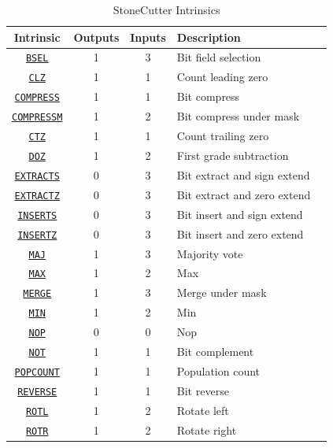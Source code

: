 \documentclass{article}
\begin{document}
\begin{table}[h]
\begin{center}
\caption{StoneCutter Intrinsics}
\vspace{0.125in}
\label{tab:scintrins}
\begin{tabular}{|c|c|c|l|l}
\hline
\textbf{Intrinsic} & \textbf{Outputs} & \textbf{Inputs} & \textbf{Description}\\
\hline
\hyperref[sec:BSEL]{\texttt{BSEL}} & 1 & 3 & Bit field selection\\
\hline
\hyperref[sec:CLZ]{\texttt{CLZ}} & 1 & 1 & Count leading zero\\
\hline
\hyperref[sec:COMPRESS]{\texttt{COMPRESS}} & 1 & 1 & Bit compress\\
\hline
\hyperref[sec:COMPRESSM]{\texttt{COMPRESSM}} & 1 & 2 & Bit compress under mask\\
\hline
\hyperref[sec:CTZ]{\texttt{CTZ}} & 1 & 1 & Count trailing zero\\
\hline
\hyperref[sec:DOZ]{\texttt{DOZ}} & 1 & 2 & First grade subtraction\\
\hline
\hyperref[sec:EXTRACTS]{\texttt{EXTRACTS}} & 0 & 3 & Bit extract and sign extend\\
\hline
\hyperref[sec:EXTRACTZ]{\texttt{EXTRACTZ}} & 0 & 3 & Bit extract and zero extend\\
\hline
\hyperref[sec:INSERTS]{\texttt{INSERTS}} & 0 & 3 & Bit insert and sign extend\\
\hline
\hyperref[sec:INSERTZ]{\texttt{INSERTZ}} & 0 & 3 & Bit insert and zero extend\\
\hline
\hyperref[sec:MAJ]{\texttt{MAJ}} & 1 & 3 & Majority vote\\
\hline
\hyperref[sec:MAX]{\texttt{MAX}} & 1 & 2 & Max\\
\hline
\hyperref[sec:MERGE]{\texttt{MERGE}} & 1 & 3 & Merge under mask\\
\hline
\hyperref[sec:MIN]{\texttt{MIN}} & 1 & 2 & Min\\
\hline
\hyperref[sec:NOP]{\texttt{NOP}} & 0 & 0 & Nop\\
\hline
\hyperref[sec:NOT]{\texttt{NOT}} & 1 & 1 & Bit complement\\
\hline
\hyperref[sec:POPCOUNT]{\texttt{POPCOUNT}} & 1 & 1 & Population count\\
\hline
\hyperref[sec:REVERSE]{\texttt{REVERSE}} & 1 & 1 & Bit reverse\\
\hline
\hyperref[sec:ROTL]{\texttt{ROTL}} & 1 & 2 & Rotate left\\
\hline
\hyperref[sec:ROTR]{\texttt{ROTR}} & 1 & 2 & Rotate right\\

\end{tabular}
\end{center}
\end{table}
\end{document}
